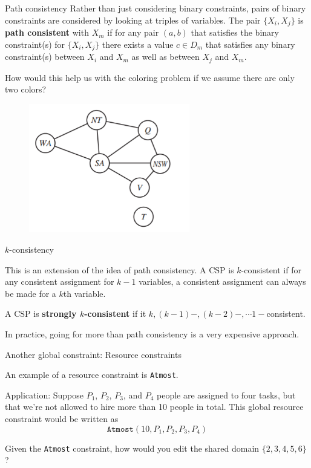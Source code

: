 \documentclass{beamer}
\begin{document}
\begin{frame}{Path consistency}
    \small
    Rather than just considering binary constraints, pairs of binary constraints
    are considered by looking at triples of variables. The pair $\{X_i, X_j\}$ is 
    {\bf path consistent} with $X_m$ if for any pair $(a, b)$ that satisfies 
    the binary constraint(s) for $\{X_i, X_j\}$ there exists a value $c \in D_m$ that satisfies any binary constraint(s) between $X_i$ and $X_m$ as well as between $X_j$ and $X_m$.
    
    
    How would this help us with the coloring problem if we assume there are only two colors?

    \begin{figure}
        \includegraphics[width=7cm]{images/map_graph}
    \end{figure}
    
\end{frame}

\begin{frame}{$k$-consistency}

    This is an extension of the idea of path consistency. 
    A CSP is $k$-consistent if for any consistent assignment for $k-1$ variables, a consistent assignment can always be made for a $k$th variable.

    \vspace{.1in}

    A CSP is {\bf strongly $k$-consistent} if it $k, (k-1)-, (k-2)-, \cdots 1-$consistent.

    \vspace{.1in}

    In practice, going for more than path consistency is a very expensive approach.

\end{frame}

\begin{frame}[t]{Another global constraint: Resource constraints}

    An example of a resource constraint is \texttt{Atmost}. 

    \vspace{.1in}
    Application: Suppose $P_1$, $P_2$, $P_3$, and $P_4$ people are assigned to four tasks, but that we're not allowed to hire more than 10 people in total. This global resource constraint would be written as 
    $$\texttt{Atmost}(10, P_1, P_2, P_3, P_4)$$

    \vspace{.1in}
    Given the \texttt{Atmost} constraint, how would you edit the shared
    domain $\{2, 3, 4, 5, 6\}$?

    
\end{frame}
\end{document}
